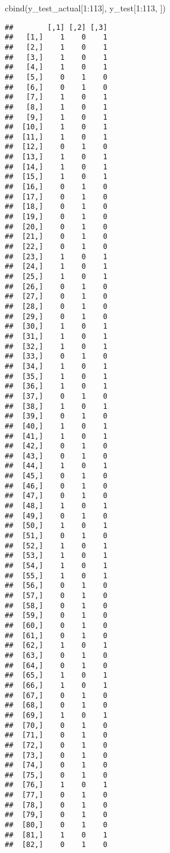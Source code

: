 \documentclass[
]{article}
\newenvironment{Shaded}{\begin{snugshade}}{\end{snugshade}}
\newcommand{\DecValTok}[1]{\textcolor[rgb]{0.00,0.00,0.81}{#1}}
\newcommand{\FunctionTok}[1]{\textcolor[rgb]{0.00,0.00,0.00}{#1}}
\newcommand{\NormalTok}[1]{#1}
\newcommand{\SpecialCharTok}[1]{\textcolor[rgb]{0.00,0.00,0.00}{#1}}
\begin{document}
\begin{Shaded}
\begin{Highlighting}[]
\FunctionTok{cbind}\NormalTok{(y\_test\_actual[}\DecValTok{1}\SpecialCharTok{:}\DecValTok{113}\NormalTok{],}
\NormalTok{      y\_test[}\DecValTok{1}\SpecialCharTok{:}\DecValTok{113}\NormalTok{, ])}
\end{Highlighting}
\end{Shaded}

\begin{verbatim}
##        [,1] [,2] [,3]
##   [1,]    1    0    1
##   [2,]    1    0    1
##   [3,]    1    0    1
##   [4,]    1    0    1
##   [5,]    0    1    0
##   [6,]    0    1    0
##   [7,]    1    0    1
##   [8,]    1    0    1
##   [9,]    1    0    1
##  [10,]    1    0    1
##  [11,]    1    0    1
##  [12,]    0    1    0
##  [13,]    1    0    1
##  [14,]    1    0    1
##  [15,]    1    0    1
##  [16,]    0    1    0
##  [17,]    0    1    0
##  [18,]    0    1    0
##  [19,]    0    1    0
##  [20,]    0    1    0
##  [21,]    0    1    0
##  [22,]    0    1    0
##  [23,]    1    0    1
##  [24,]    1    0    1
##  [25,]    1    0    1
##  [26,]    0    1    0
##  [27,]    0    1    0
##  [28,]    0    1    0
##  [29,]    0    1    0
##  [30,]    1    0    1
##  [31,]    1    0    1
##  [32,]    1    0    1
##  [33,]    0    1    0
##  [34,]    1    0    1
##  [35,]    1    0    1
##  [36,]    1    0    1
##  [37,]    0    1    0
##  [38,]    1    0    1
##  [39,]    0    1    0
##  [40,]    1    0    1
##  [41,]    1    0    1
##  [42,]    0    1    0
##  [43,]    0    1    0
##  [44,]    1    0    1
##  [45,]    0    1    0
##  [46,]    0    1    0
##  [47,]    0    1    0
##  [48,]    1    0    1
##  [49,]    0    1    0
##  [50,]    1    0    1
##  [51,]    0    1    0
##  [52,]    1    0    1
##  [53,]    1    0    1
##  [54,]    1    0    1
##  [55,]    1    0    1
##  [56,]    0    1    0
##  [57,]    0    1    0
##  [58,]    0    1    0
##  [59,]    0    1    0
##  [60,]    0    1    0
##  [61,]    0    1    0
##  [62,]    1    0    1
##  [63,]    0    1    0
##  [64,]    0    1    0
##  [65,]    1    0    1
##  [66,]    1    0    1
##  [67,]    0    1    0
##  [68,]    0    1    0
##  [69,]    1    0    1
##  [70,]    0    1    0
##  [71,]    0    1    0
##  [72,]    0    1    0
##  [73,]    0    1    0
##  [74,]    0    1    0
##  [75,]    0    1    0
##  [76,]    1    0    1
##  [77,]    0    1    0
##  [78,]    0    1    0
##  [79,]    0    1    0
##  [80,]    0    1    0
##  [81,]    1    0    1
##  [82,]    0    1    0

\end{verbatim}
\end{document}
